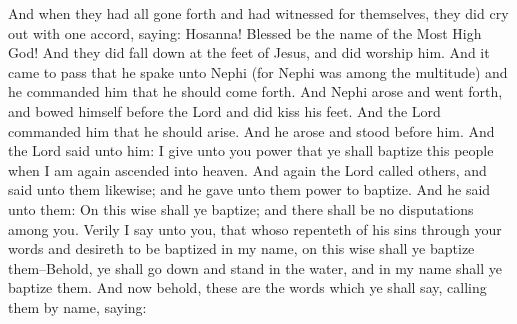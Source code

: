 \bverse \iffalse And when they had all gone forth and had witnessed for themselves, they did cry out with one accord, saying: \fi
And when they had all gone forth and had witnessed for themselves, they did cry out with one accord, saying:
\bverse \iffalse Hosanna! Blessed be the name of the Most High God! And they did fall down at the feet of Jesus, and did worship him. \fi
Hosanna! Blessed be the name of the Most High God! And they did fall down at the feet of Jesus, and did worship him.
\bverse \iffalse And it came to pass that he spake unto Nephi (for Nephi was among the multitude) and he commanded him that he should come forth. \fi
And it came to pass that he spake unto Nephi (for Nephi was among the multitude) and he commanded him that he should come forth.
\bverse \iffalse And Nephi arose and went forth, and bowed himself before the Lord and did kiss his feet. \fi
And Nephi arose and went forth, and bowed himself before the Lord and did kiss his feet.
\bverse \iffalse And the Lord commanded him that he should arise. And he arose and stood before him. \fi
And the Lord commanded him that he should arise. And he arose and stood before him.
\bverse \iffalse And the Lord said unto him: I give unto you power that ye shall baptize this people when I am again ascended into heaven. \fi
And the Lord said unto him: I give unto you power that ye shall baptize this people when I am again ascended into heaven.
\bverse \iffalse And again the Lord called others, and said unto them likewise; and he gave unto them power to baptize. And he said unto them: On this wise shall ye baptize; and there shall be no disputations among you. \fi
And again the Lord called others, and said unto them likewise; and he gave unto them power to baptize. And he said unto them: On this wise shall ye baptize; and there shall be no disputations among you.
\bverse \iffalse Verily I say unto you, that whoso repenteth of his sins through your words and desireth to be baptized in my name, on this wise shall ye baptize them--Behold, ye shall go down and stand in the water, and in my name shall ye baptize them. \fi
Verily I say unto you, that whoso repenteth of his sins through your words and desireth to be baptized in my name, on this wise shall ye baptize them--Behold, ye shall go down and stand in the water, and in my name shall ye baptize them.
\bverse \iffalse And now behold, these are the words which ye shall say, calling them by name, saying: \fi
And now behold, these are the words which ye shall say, calling them by name, saying:
